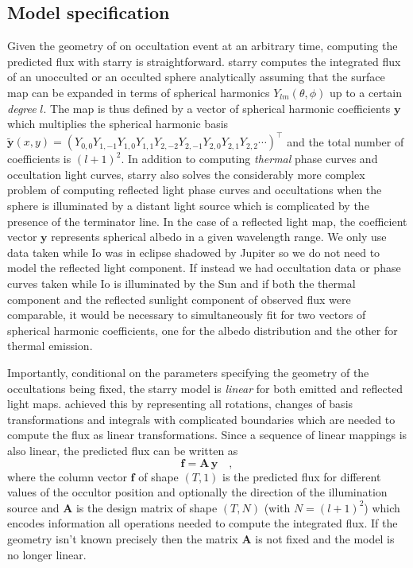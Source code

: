 \documentclass[modern]{aastex62}
\begin{document}
\subsection{Model specification}
\label{ssec:model_spec}
Given the geometry of on occultation event at an arbitrary time, computing the predicted flux with \textsf{starry} is straightforward.
\textsf{starry} computes the integrated flux of an unocculted or an occulted sphere analytically assuming that the surface map can be expanded in terms of spherical harmonics $Y_{lm}(\theta,\phi)$ up to a certain \emph{degree} $l$.
The map is thus defined by a vector of spherical harmonic coefficients $\mathbf{y}$ which multiplies the spherical harmonic basis $\tilde{\mathbf{y}}(x, y)=\left(Y_{0,0} Y_{1,-1} Y_{1,0} Y_{1,1} Y_{2,-2} Y_{2,-1} Y_{2,0} Y_{2,1} Y_{2,2} \cdots\right)^{\top}$ and the total number of coefficients is $(l+1)^2$.
In addition to computing \emph{thermal} phase curves and occultation light curves, \textsf{starry} also solves the considerably more complex problem of computing reflected light phase curves and occultations when the sphere is illuminated by a distant light source \citep[Luger et al. 2020 in prep][]{} which is complicated by the presence of the terminator line.
In the case of a reflected light map, the coefficient vector $\mathbf{y}$ represents spherical albedo in a given wavelength range.
We only use data taken while Io was in eclipse shadowed by Jupiter so we do not need to model the reflected light component. 
If instead we had occultation data or phase curves taken while Io is illuminated by the Sun and if both the thermal component and the reflected sunlight component of observed flux were comparable, it would be necessary to simultaneously fit for two vectors of spherical harmonic coefficients, 
one for the albedo distribution and the other for thermal emission.

Importantly, conditional on the parameters specifying the geometry of the occultations being fixed, the \textsf{starry} model is \emph{linear} for both emitted and reflected light maps.
\cite{luger2019} achieved this by representing all rotations, changes of basis transformations and integrals with complicated boundaries which are needed to compute the flux as linear transformations.
Since a sequence of linear mappings is also linear, the predicted flux can be written as
\begin{equation}
    \mathbf{f}=\mathbf{A}\,\mathbf{y}
    \quad,
    \label{eq:linear_model}
\end{equation}
where the column vector $\mathbf{f}$ of shape $(T, 1)$ is the predicted flux for different values of the occultor position and optionally the direction of the illumination source and $\mathbf{A}$ is the design
matrix of shape $(T, N)$ (with $N=(l+1)^2$) which encodes information all operations needed to compute the integrated flux.
If the geometry isn't known precisely then the matrix $\mathbf{A}$ is not fixed and the model is no longer linear.
\end{document}
